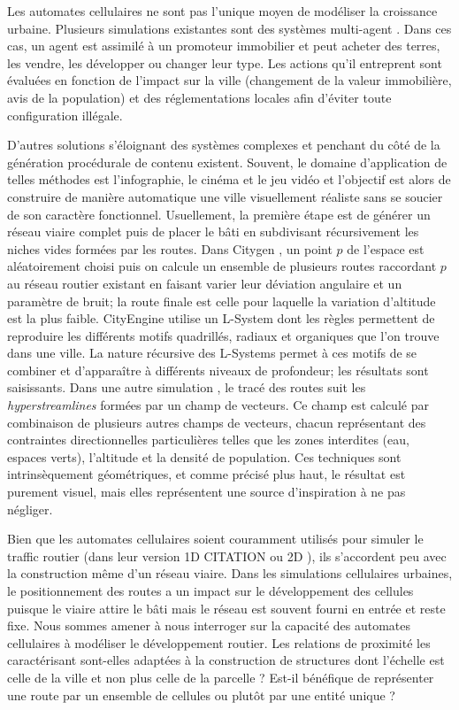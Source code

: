 \documentclass[10pt]{article}
\begin{document}
\begin{multicols}{2}
Les automates cellulaires ne sont pas l'unique moyen de modéliser la
croissance urbaine. Plusieurs simulations existantes sont des systèmes
multi-agent \cite{Lechnera,Lechner2004}. Dans ces cas, un agent est
assimilé à un promoteur immobilier et peut acheter des terres, les
vendre, les développer ou changer leur type. Les actions qu'il
entreprent sont évaluées en fonction de l'impact sur la ville
(changement de la valeur immobilière, avis de la population) et des
réglementations locales afin d'éviter toute configuration illégale.

D'autres solutions s'éloignant des systèmes complexes et penchant du
côté de la génération procédurale de contenu existent. Souvent, le
domaine d'application de telles méthodes est l'infographie, le cinéma
et le jeu vidéo et l'objectif est alors de construire de manière
automatique une ville visuellement réaliste sans se soucier de son
caractère fonctionnel. Usuellement, la première étape est de générer
un réseau viaire complet puis de placer le bâti en subdivisant
récursivement les niches vides formées par les routes. Dans Citygen
\cite{Kelly2007}, un point $p$ de l'espace est aléatoirement choisi
puis on calcule un ensemble de plusieurs routes raccordant $p$ au
réseau routier existant en faisant varier leur déviation angulaire et
un paramètre de bruit; la route finale est celle pour laquelle la
variation d'altitude est la plus faible. CityEngine \cite{Parish2001}
utilise un L-System dont les règles permettent de reproduire les
différents motifs quadrillés, radiaux et organiques que l'on trouve
dans une ville. La nature récursive des L-Systems permet à ces motifs
de se combiner et d'apparaître à différents niveaux de profondeur; les
résultats sont saisissants. Dans une autre simulation \cite{Chen2008},
le tracé des routes suit les \textit{hyperstreamlines} formées par un
champ de vecteurs. Ce champ est calculé par combinaison de plusieurs
autres champs de vecteurs, chacun représentant des contraintes
directionnelles particulières telles que les zones interdites (eau,
espaces verts), l'altitude et la densité de population. Ces techniques
sont intrinsèquement géométriques, et comme précisé plus haut, le
résultat est purement visuel, mais elles représentent une source
d'inspiration à ne pas négliger.

Bien que les automates cellulaires soient couramment utilisés pour
simuler le traffic routier (dans leur version 1D CITATION ou 2D
\cite{Queloz1996}), ils s'accordent peu avec la construction même d'un
réseau viaire. Dans les simulations cellulaires urbaines, le
positionnement des routes a un impact sur le développement des
cellules puisque le viaire attire le bâti mais le réseau est souvent
fourni en entrée et reste fixe. Nous sommes amener à nous interroger
sur la capacité des automates cellulaires à modéliser le développement
routier. Les relations de proximité les caractérisant sont-elles
adaptées à la construction de structures dont l'échelle est celle de
la ville et non plus celle de la parcelle ? Est-il bénéfique de
représenter une route par un ensemble de cellules ou plutôt par une
entité unique ?


\end{multicols}
\end{document}
